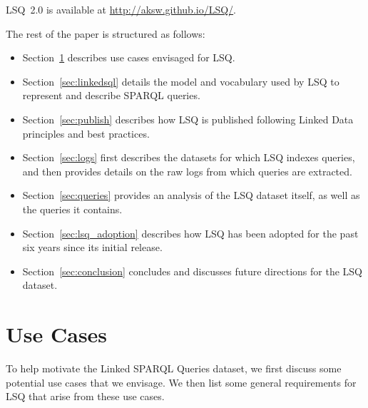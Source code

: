 \noindent
LSQ~2.0 is available at \url{http://aksw.github.io/LSQ/}.

The rest of the paper is structured as follows:

\begin{itemize}
\item Section~\ref{sec:usecase} describes use cases envisaged for LSQ.
\item Section~\ref{sec:linkedsql} details the model and vocabulary used by LSQ to represent and describe SPARQL queries.
\item Section~\ref{sec:publish} describes how LSQ is published following Linked Data principles and best practices.
\item Section~\ref{sec:logs} first describes the datasets for which LSQ indexes queries, and then provides details on the raw logs from which queries are extracted.
\item Section~\ref{sec:queries} provides an analysis of the LSQ dataset itself, as well as the queries it contains.
\item Section~\ref{sec:lsq_adoption} describes how LSQ has been adopted for the past six years since its initial release.
\item Section~\ref{sec:conclusion} concludes and discusses future directions for the LSQ dataset.
\end{itemize}




\section{Use Cases}
\label{sec:usecase}

To help motivate the Linked SPARQL Queries dataset, we first discuss some potential use cases that we envisage. We then list some general requirements for LSQ that arise from these use cases.

